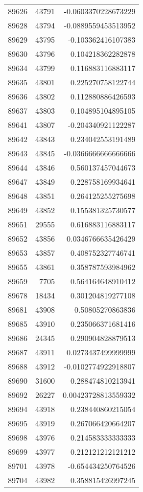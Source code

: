 \begin{tabular}{r | r | r}
89626 & 43791 & -0.0603370228673229 \\
89628 & 43794 & -0.0889559453513952 \\
89629 & 43795 & -0.103362416107383 \\
89630 & 43796 & 0.104218362282878 \\
89634 & 43799 & 0.116883116883117 \\
89635 & 43801 & 0.225270758122744 \\
89636 & 43802 & 0.112880886426593 \\
89637 & 43803 & 0.104895104895105 \\
89641 & 43807 & -0.204340921122287 \\
89642 & 43843 & 0.234042553191489 \\
89643 & 43845 & -0.0366666666666666 \\
89644 & 43846 & 0.560137457044673 \\
89647 & 43849 & 0.228758169934641 \\
89648 & 43851 & 0.264125255275698 \\
89649 & 43852 & 0.155381325730577 \\
89651 & 29555 & 0.616883116883117 \\
89652 & 43856 & 0.0346766635426429 \\
89653 & 43857 & 0.408752327746741 \\
89655 & 43861 & 0.358787593984962 \\
89659 & 7705 & 0.564164648910412 \\
89678 & 18434 & 0.301204819277108 \\
89681 & 43908 & 0.50805270863836 \\
89685 & 43910 & 0.235066371681416 \\
89686 & 24345 & 0.290904828879513 \\
89687 & 43911 & 0.0273437499999999 \\
89688 & 43912 & -0.0102774922918807 \\
89690 & 31600 & 0.288474810213941 \\
89692 & 26227 & 0.00423728813559332 \\
89694 & 43918 & 0.238440860215054 \\
89695 & 43919 & 0.267066420664207 \\
89698 & 43976 & 0.214583333333333 \\
89699 & 43977 & 0.212121212121212 \\
89701 & 43978 & -0.654434250764526 \\
89704 & 43982 & 0.358815426997245 \\

\end{tabular}

